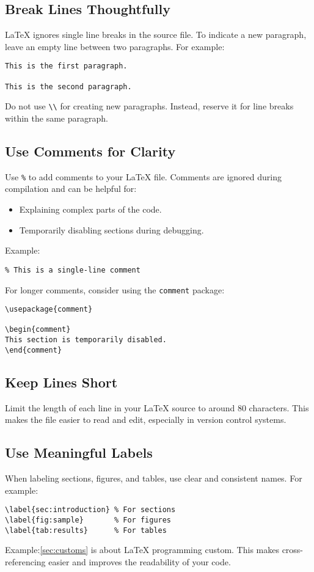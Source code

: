 \documentclass[12pt]{article}
\begin{document}
\subsection*{Break Lines Thoughtfully}
LaTeX ignores single line breaks in the source file. To indicate a new paragraph, leave an empty line between two paragraphs. For example:
\begin{lstlisting}
This is the first paragraph.

This is the second paragraph.
\end{lstlisting}
Do not use \texttt{\textbackslash\textbackslash} for creating new paragraphs. Instead, reserve it for line breaks within the same paragraph.

\subsection*{Use Comments for Clarity}
Use \texttt{\%} to add comments to your LaTeX file. Comments are ignored during compilation and can be helpful for:
\begin{itemize}
    \item Explaining complex parts of the code.
    \item Temporarily disabling sections during debugging.
\end{itemize}

Example:
\begin{lstlisting}
% This is a single-line comment
\end{lstlisting}

For longer comments, consider using the \texttt{comment} package:
\begin{lstlisting}
\usepackage{comment}

\begin{comment}
This section is temporarily disabled.
\end{comment}
\end{lstlisting}

\subsection*{Keep Lines Short}
Limit the length of each line in your LaTeX source to around 80 characters. This makes the file easier to read and edit, especially in version control systems.

\subsection*{Use Meaningful Labels}
When labeling sections, figures, and tables, use clear and consistent names. For example:
\begin{lstlisting}
\label{sec:introduction} % For sections
\label{fig:sample}       % For figures
\label{tab:results}      % For tables
\end{lstlisting}
Example:\ref{sec:customs} is about LaTeX programming custom.
This makes cross-referencing easier and improves the readability of your code.
\end{document}
